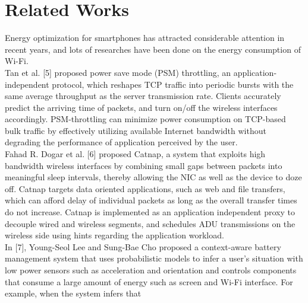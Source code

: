 \documentclass[journal]{IEEEtran}
\begin{document}
\section{Related Works}
Energy optimization for smartphones has attracted considerable attention in recent years, and lots of researches 
have been done on the energy consumption of Wi-Fi. 
\\
\indent
Tan et al. [5] proposed power save mode
(PSM) throttling, an application-independent protocol, which reshapes TCP traffic into periodic bursts
with the same average throughput as the server transmission rate. Clients accurately
predict the arriving time of packets, and turn on/off the wireless interfaces accordingly.
PSM-throttling can minimize power consumption on TCP-based bulk traffic by effectively
utilizing available Internet bandwidth without degrading the performance of application
perceived by the user.
\\
\indent
Fahad R. Dogar et al. [6] proposed Catnap, a system that exploits high bandwidth wireless interfaces
by combining small gaps between packets into meaningful sleep intervals, thereby allowing the
NIC as well as the device to doze off. Catnap targets data
oriented applications, such as web and file transfers, which
can afford delay of individual packets as long as the overall
transfer times do not increase. Catnap is implemented as an application independent 
proxy to decouple wired and wireless segments, and schedules ADU 
transmissions on the wireless side using hints regarding the 
application workload.
\\
\indent
In [7], Young-Seol Lee and Sung-Bae Cho proposed a context-aware battery management
system that uses probabilistic models to infer a 
user’s situation with low power sensors such as acceleration and
orientation and controls components that consume a large amount
of energy such as screen and Wi-Fi interface. 
For example, when the system infers that 
\end{document}
